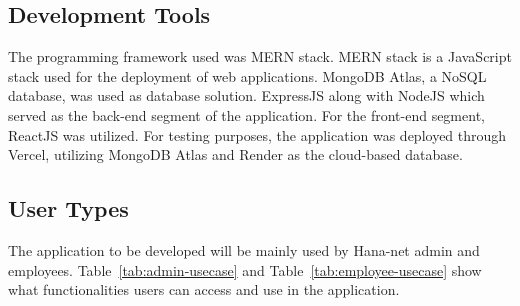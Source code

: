 \documentclass[journal]{./IEEE/IEEEtran}
\begin{document}
\subsection{\textbf{Development Tools}}
The programming framework used was MERN stack. MERN stack is a JavaScript stack used for the deployment of web applications. MongoDB Atlas, a NoSQL database, was used as database solution. ExpressJS along with NodeJS which served as the back-end segment of the application. For the front-end segment, ReactJS was utilized.
For testing purposes, the application was deployed through Vercel, utilizing MongoDB Atlas and Render as the cloud-based database.

\subsection{\textbf{User Types}}
The application to be developed will be mainly used by Hana-net admin and employees. Table~\ref{tab:admin-usecase} and Table~\ref{tab:employee-usecase} show what functionalities users can access and use in the application.  
	
\end{document}
